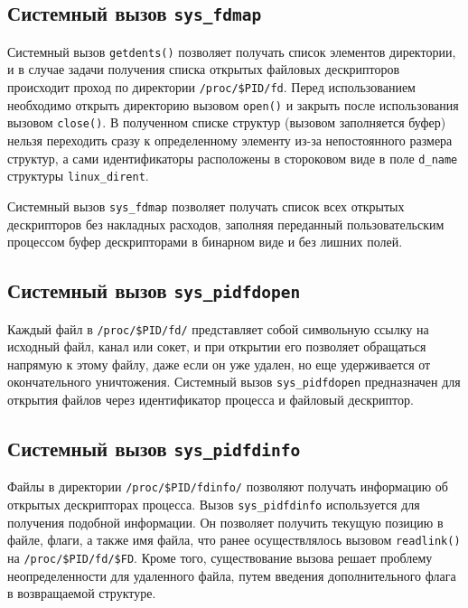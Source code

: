 \subsection{Системный вызов \texttt{sys\_fdmap}}
\label{sub:sys:sys_fdmap}

Системный вызов \texttt{getdents()} позволяет получать список элементов
директории, и в случае задачи получения списка открытых файловых
дескрипторов происходит проход по директории \texttt{/proc/\$PID/fd}. Перед
использованием необходимо открыть директорию вызовом \texttt{open()} и закрыть
после использования вызовом \texttt{close()}. В полученном списке структур
(вызовом заполняется буфер) нельзя переходить сразу к определенному элементу
из-за непостоянного размера структур, а сами идентификаторы расположены в
стороковом виде в поле \texttt{d\_name} структуры \texttt{linux\_dirent}.

Системный вызов \texttt{sys\_fdmap} позволяет получать список всех открытых
дескрипторов без накладных расходов, заполняя переданный пользовательским
процессом буфер дескрипторами в бинарном виде и без лишних полей.

\subsection{Системный вызов \texttt{sys\_pidfdopen}}
\label{sub:sys:sys_pidfdopen}

Каждый файл в \texttt{/proc/\$PID/fd/} представляет собой символьную ссылку на
исходный файл, канал или сокет, и при открытии его позволяет обращаться напрямую
к этому файлу, даже если он уже удален, но еще удерживается от окончательного
уничтожения. Системный вызов \texttt{sys\_pidfdopen} предназначен для открытия
файлов через идентификатор процесса и файловый дескриптор. 

\subsection{Системный вызов \texttt{sys\_pidfdinfo}}
\label{sub:sys:sys_pidfdinfo}

Файлы в директории \texttt{/proc/\$PID/fdinfo/} позволяют получать информацию
об открытых дескрипторах процесса. Вызов
\texttt{sys\_pidfdinfo} используется для получения подобной информации. Он
позволяет получить текущую позицию в файле, флаги, а также имя файла, что ранее
осуществлялось вызовом \texttt{readlink()} на \texttt{/proc/\$PID/fd/\$FD}.
Кроме того, существование вызова решает проблему неопределенности для удаленного
файла, путем введения дополнительного флага в возвращаемой структуре.

